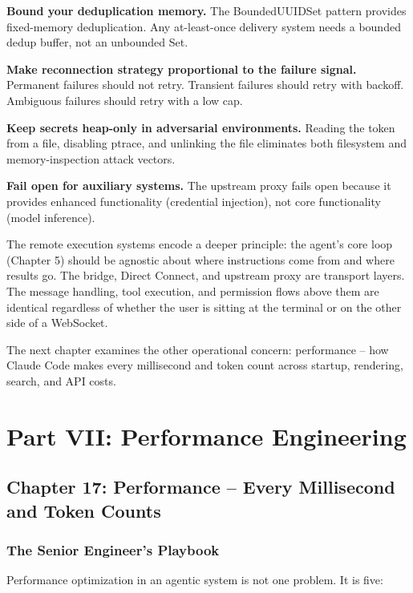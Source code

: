 \documentclass[
  english,
  11pt,
  letterpaper,
]{book}
\begin{document}
\textbf{Bound your deduplication memory.} The BoundedUUIDSet pattern
provides fixed-memory deduplication. Any at-least-once delivery system
needs a bounded dedup buffer, not an unbounded Set.

\textbf{Make reconnection strategy proportional to the failure signal.}
Permanent failures should not retry. Transient failures should retry
with backoff. Ambiguous failures should retry with a low cap.

\textbf{Keep secrets heap-only in adversarial environments.} Reading the
token from a file, disabling ptrace, and unlinking the file eliminates
both filesystem and memory-inspection attack vectors.

\textbf{Fail open for auxiliary systems.} The upstream proxy fails open
because it provides enhanced functionality (credential injection), not
core functionality (model inference).

The remote execution systems encode a deeper principle: the agent's core
loop (Chapter 5) should be agnostic about where instructions come from
and where results go. The bridge, Direct Connect, and upstream proxy are
transport layers. The message handling, tool execution, and permission
flows above them are identical regardless of whether the user is sitting
at the terminal or on the other side of a WebSocket.

The next chapter examines the other operational concern: performance --
how Claude Code makes every millisecond and token count across startup,
rendering, search, and API costs.

\part{Part VII: Performance Engineering}

\chapter{Chapter 17: Performance -- Every Millisecond and Token
Counts}\label{chapter-17-performance-every-millisecond-and-token-counts}

\section{The Senior Engineer's
Playbook}\label{the-senior-engineers-playbook}

Performance optimization in an agentic system is not one problem. It is
five:
\end{document}

